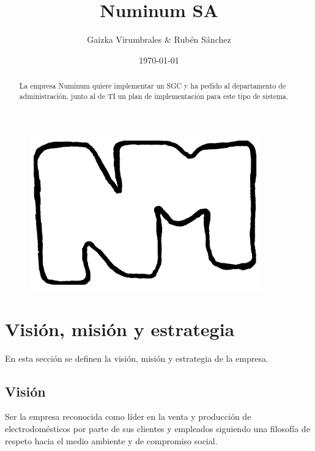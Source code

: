 \documentclass[twoside]{article}
\title{Numinum SA}
\author{Gaizka Virumbrales \& Rubén Sánchez}
\date{\today}
\begin{document}
\maketitle
\begin{figure}[ht!]
	\includegraphics[width=100mm]{logo.png}
	\centering
\end{figure}
\thispagestyle{empty}
\newpage
\newpage
\null
\thispagestyle{empty}
\newpage



\begin{abstract}
La empresa Numinum quiere implementar un SGC y ha pedido al departamento de administración, junto al de TI un plan de implementación para este tipo de sistema.
\end{abstract}


\setcounter{tocdepth}{2}
\tableofcontents
\newpage
{}
\setcounter{page}{1}
\section{Visión, misión y estrategia}

En esta sección se definen la visión, misión y estrategia de la empresa.

\subsection{Visión}
\label{sec:vision}

Ser la empresa reconocida como líder en la venta y producción de electrodomésticos por parte de sus clientes y empleados siguiendo una filosofía de respeto hacia el medio ambiente y de compromiso social.
\\
\\
\end{document}
